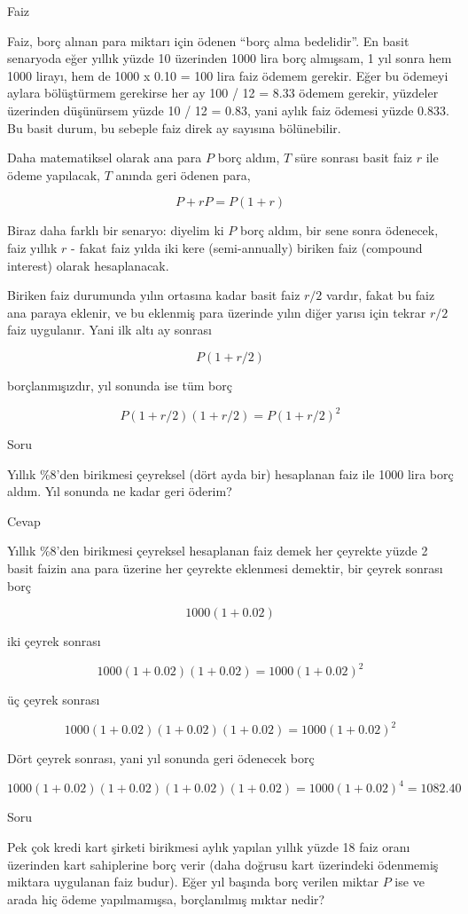 \documentclass[12pt,fleqn]{article}\usepackage{../../common}
\begin{document}
Faiz

Faiz, borç alınan para miktarı için ödenen ``borç alma bedelidir''. En basit
senaryoda eğer yıllık yüzde 10 üzerinden 1000 lira borç almışsam, 1 yıl sonra
hem 1000 lirayı, hem de 1000 x 0.10 = 100 lira faiz ödemem gerekir. Eğer bu
ödemeyi aylara bölüştürmem gerekirse her ay 100 / 12 = 8.33 ödemem gerekir,
yüzdeler üzerinden düşünürsem yüzde 10 / 12 = 0.83, yani aylık faiz ödemesi
yüzde 0.833. Bu basit durum, bu sebeple faiz direk ay sayısına bölünebilir.

Daha matematiksel olarak ana para $P$ borç aldım, $T$ süre sonrası basit faiz
$r$ ile ödeme yapılacak, $T$ anında geri ödenen para,

$$ P + rP = P(1+r) $$

Biraz daha farklı bir senaryo: diyelim ki $P$ borç aldım, bir sene sonra
ödenecek, faiz yıllık $r$ - fakat faiz yılda iki kere (semi-annually) biriken
faiz (compound interest) olarak hesaplanacak.

Biriken faiz durumunda yılın ortasına kadar basit faiz $r/2$ vardır, fakat bu
faiz ana paraya eklenir, ve bu eklenmiş para üzerinde yılın diğer yarısı için
tekrar $r/2$ faiz uygulanır. Yani ilk altı ay sonrası

$$ P(1+r/2) $$

borçlanmışızdır, yıl sonunda ise tüm borç

$$ P(1+r/2)(1+r/2) = P(1+r/2)^2$$

Soru

Yıllık \%8'den birikmesi çeyreksel (dört ayda bir) hesaplanan faiz ile 1000 lira
borç aldım. Yıl sonunda ne kadar geri öderim?

Cevap

Yıllık \%8'den birikmesi çeyreksel hesaplanan faiz demek her çeyrekte yüzde 2
basit faizin ana para üzerine her çeyrekte eklenmesi demektir, bir çeyrek
sonrası borç

$$ 1000(1+0.02) $$

iki çeyrek sonrası

$$ 1000(1+0.02)(1+0.02) = 1000(1+0.02)^2 $$

üç çeyrek sonrası

$$ 1000(1+0.02)(1+0.02)(1+0.02) = 1000(1+0.02)^2 $$

Dört çeyrek sonrası, yani yıl sonunda geri ödenecek borç

$$ 1000(1+0.02)(1+0.02)(1+0.02)(1+0.02) = 1000(1+0.02)^4 = 1082.40$$

Soru

Pek çok kredi kart şirketi birikmesi aylık yapılan yıllık yüzde 18 faiz oranı
üzerinden kart sahiplerine borç verir (daha doğrusu kart üzerindeki ödenmemiş
miktara uygulanan faiz budur). Eğer yıl başında borç verilen miktar $P$ ise ve
arada hiç ödeme yapılmamışsa, borçlanılmış mıktar nedir?
\end{document}
